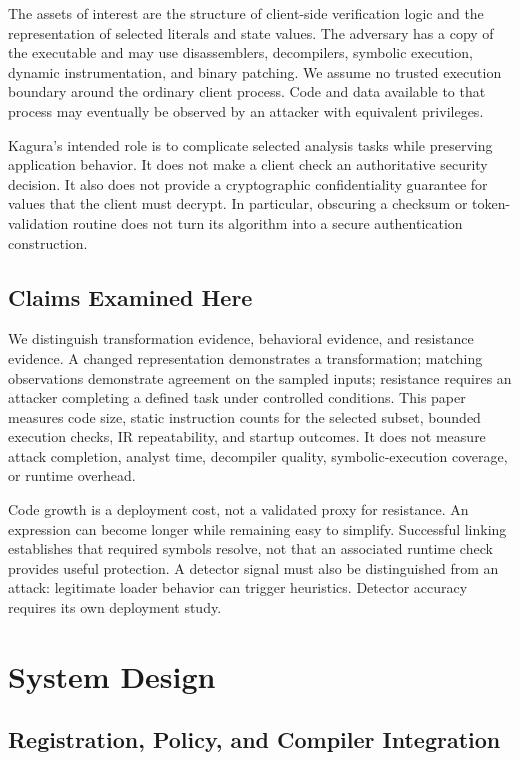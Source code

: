 \documentclass[conference]{IEEEtran}
\begin{document}
The assets of interest are the structure of client-side verification
logic and the representation of selected literals and state values.
The adversary has a copy of the executable and may use disassemblers,
decompilers, symbolic execution, dynamic instrumentation, and binary
patching. We assume no trusted execution boundary around the ordinary
client process. Code and data available to that process may eventually
be observed by an attacker with equivalent privileges.

Kagura's intended role is to complicate selected analysis tasks while
preserving application behavior. It does not make a client check an
authoritative security decision. It also does not provide a
cryptographic confidentiality guarantee for values that the client
must decrypt. In particular, obscuring a checksum or token-validation
routine does not turn its algorithm into a secure authentication
construction.

\subsection{Claims Examined Here}

We distinguish transformation evidence, behavioral evidence, and resistance
evidence. A changed representation demonstrates a transformation; matching
observations demonstrate agreement on the sampled inputs; resistance requires
an attacker completing a defined task under controlled conditions.
This paper measures code size, static instruction counts for the selected
subset, bounded execution checks, IR repeatability, and startup outcomes.
It does not measure attack completion, analyst time, decompiler quality,
symbolic-execution coverage, or runtime overhead.

Code growth is a deployment cost, not a validated proxy for resistance.
An expression can become longer while remaining easy to simplify.
Successful linking establishes that required symbols resolve, not that an
associated runtime check provides useful protection. A detector signal must
also be distinguished from an attack: legitimate loader behavior can trigger
heuristics. Detector accuracy requires its own deployment study.

\section{System Design}
\label{sec:design}

\subsection{Registration, Policy, and Compiler Integration}
\end{document}

